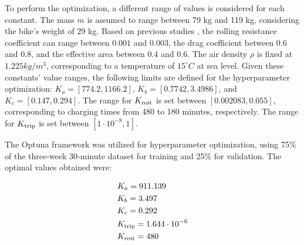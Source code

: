       To perform the optimization, a different range of values is considered for each constant. The mass $m$ is assumed to range between 79 kg and 119 kg, considering the bike's weight of 29 kg. Based on previous studies \cite{Steyn2014, Bertucci2013}, the rolling resistance coefficient can range between $0.001$ and $0.003$, the drag coefficient between $0.6$ and $0.8$, and the effective area between $0.4$ and $0.6$. The air density $\rho$ is fixed at $1.225kg/m^3$, corresponding to a temperature of $15^{\circ}C$ at sea level. Given these constants' value ranges, the following limits are defined for the hyperparameter optimization: $K_a = [774.2, 1166.2]$, $K_b = [0.7742, 3.4986]$, and $K_c = [0.147, 0.294]$. The range for $K_{\rm rest}$ is set between $[0.002083, 0.055]$, corresponding to charging times from 480 to 180 minutes, respectively. The range for $K_{\rm trip}$ is set between $[1 \cdot 10^{-8},1]$.

      The Optuna framework was utilized for hyperparameter optimization, using 75\% of the three-week 30-minute dataset for training and 25\% for validation. The optimal values obtained were:

      \begin{align*}
        & K_a = 911.139 \\
        & K_b = 3.497 \\
        & K_c = 0.292 \\
        & K_{\rm trip} =1.644 \cdot 10^{-6} \\
        & K_{\rm rest} = 480
      \end{align*}